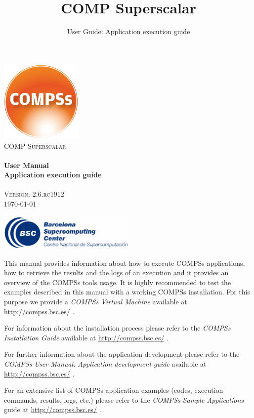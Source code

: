 \documentclass[a4paper,12pt]{article}
\title{COMP Superscalar}
\author{User Guide: Application execution guide}
\def \compssversion {2.6.rc1912}
\begin{document}
  \hypersetup{pageanchor=false}
  \begin{titlepage} 
    \begin{center} 
      \includegraphics[width=0.3\textwidth]{./Figures/Logos/degradado-naranja-compss.jpg}~\\[1cm] 
      \textsc{\LARGE COMP Superscalar}\\[1.5cm] 
      
      \HRule \\[0.4cm] 
      { \huge \bfseries User Manual \\[0.4cm] }
      { \large \bfseries Application execution guide \\[0.4cm] } 
      \HRule \\[1.5cm] 

      { \large \textsc{Version: \compssversion}} \\[0.3cm]
      { \large \today } 
      
      \vfill 
      \includegraphics[width=0.5\textwidth]{./Figures/bsc_280.jpg}~\\[1cm]
    \end{center} 
  \end{titlepage}
  \hypersetup{pageanchor=true}
  
  {
    This manual provides information about how to execute COMPSs applications, how to retrieve the results and the logs of an execution 
    and it provides an overview of the COMPSs tools usage. It is highly recommended to test the examples described in this manual with 
    a working COMPSs installation. For this purpose we provide a \textit{COMPSs Virtual Machine} available at \url{http://compss.bsc.es/} .
    \newline
    
    For information about the installation process please refer to the \textit{COMPSs Installation Guide} available at
    \url{http://compss.bsc.es/} .
    \newline
    
    For further information about the application development please refer to the \textit{COMPSs User Manual: Application development
    guide} available at \url{http://compss.bsc.es/} .
    \newline
    
    For an extensive list of COMPSs application examples (codes, execution commands, results, logs, etc.) please refer to 
    the \textit{COMPSs Sample Applications} guide at \url{http://compss.bsc.es/} .
  }
  
\end{document}
